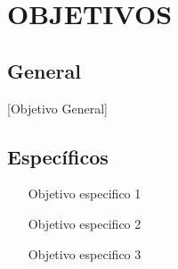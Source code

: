 	\nopagebreak[0]
	\clearpage
	\chapter{OBJETIVOS}
		\section{General}
			[Objetivo General]
	
	\section{Específicos}
		\begin{enumerate}
			\item [Objetivo especifico 1]
			\item [Objetivo especifico 2]
			\item [Objetivo especifico 3]
		\end{enumerate}
